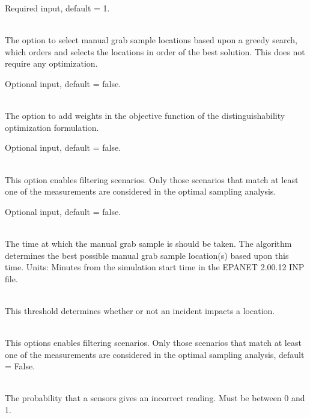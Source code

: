 \begin{description}[topsep=0pt,parsep=0.5em,itemsep=-0.4em]
\begin{description}[topsep=0pt,parsep=0.5em,itemsep=-0.4em]
                Required input, default = 1.
    \item[{greedy selection}]\hfill
\\The option to select manual grab sample locations based upon a greedy search, which orders and selects the locations in order of the best solution.
                This does not require any optimization.

                Optional input, default = false.
    \item[{with weights}]\hfill
\\The option to add weights in the objective function of the distinguishability 
                optimization formulation.

                Optional input, default = false.
    \item[{filter scenarios}]\hfill
\\ This option enables filtering scenarios. Only those scenarios 
                that match at least one of the measurements are considered
                in the optimal sampling analysis.
				
				Optional input, default = false.
  \end{description}
  \item[{uq}]\hfill
  \begin{description}[topsep=0pt,parsep=0.5em,itemsep=-0.4em]
    \item[{analysis time}]\hfill
\\The time at which the manual grab sample is should be taken. 
                The algorithm determines the best possible manual grab sample location(s)
                based upon this time. Units: Minutes from the simulation start time in the
                EPANET 2.00.12 INP file.
    \item[{threshold}]\hfill
      \\This threshold determines whether or not an incident impacts a
      location.
    \item[{filter scenarios}]\hfill
\\ This options enables filtering scenarios. Only those scenarios 
                that match at least one of the measurements are considered
                in the optimal sampling analysis, default = False.
    \item[{measurement failure}]\hfill
\\The probability that a sensors gives an incorrect reading. Must be between 0 and 1. 
                

\end{description}
\end{description}
